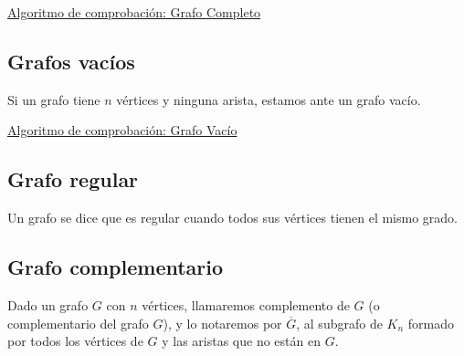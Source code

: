 \underline{Algoritmo de comprobación: Grafo Completo}\\



\subsection{Grafos vacíos}

\begin{fondo}
Si un grafo tiene $n$ vértices y ninguna arista, estamos ante un grafo vacío.
\end{fondo}

\underline{Algoritmo de comprobación: Grafo Vacío}\\



\subsection{Grafo regular}

\begin{fondo}
Un grafo se dice que es regular cuando todos sus vértices tienen el mismo grado.
\end{fondo}

\subsection{Grafo complementario}

\begin{fondo}
Dado un grafo $G$ con $n$ vértices, llamaremos complemento de $G$ (o complementario del grafo $G$), y lo notaremos por $\overline G$, al subgrafo de $K_n$ formado por todos los vértices de $G$ y las aristas que no están en $G$.
\end{fondo}

